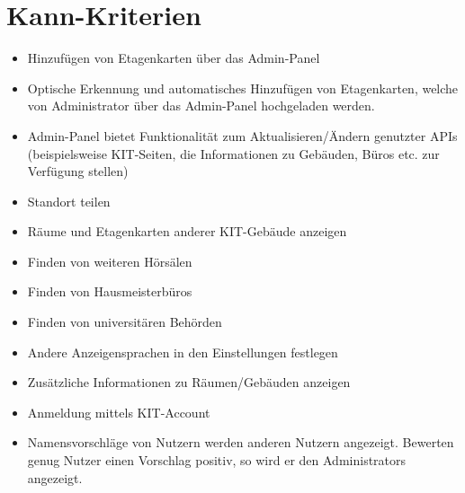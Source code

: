 \section{Kann-Kriterien}

\begin{itemize}

    \item Hinzufügen von Etagenkarten über das \Gls{Admin-Panel}
    \item Optische Erkennung und automatisches Hinzufügen von Etagenkarten,
          welche von \Gls{Administrator} über das \Gls{Admin-Panel} hochgeladen werden.
          
    \item \Gls{Admin-Panel} bietet Funktionalität zum Aktualisieren/Ändern genutzter \Gls{API}s (beispielsweise \Gls{KIT}-Seiten, die Informationen zu Gebäuden, Büros etc. zur Verfügung stellen)
    \item Standort teilen 
    \item Räume und Etagenkarten anderer \Gls{KIT}-Gebäude anzeigen
    \item Finden von weiteren Hörsälen
    \item Finden von Hausmeisterbüros
    \item Finden von universitären Behörden
    \item Andere Anzeigensprachen in den Einstellungen festlegen
    \item Zusätzliche Informationen zu Räumen/Gebäuden anzeigen
    \item Anmeldung mittels \Gls{KIT}-Account
    \item Namensvorschläge von Nutzern werden anderen Nutzern angezeigt. Bewerten genug Nutzer einen 
    Vorschlag positiv, so wird er den \Glspl{Administrator} angezeigt.
    
        

\end{itemize}
